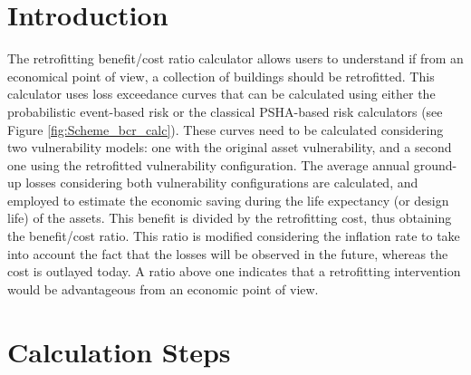 \section{Introduction}

The retrofitting benefit/cost ratio calculator allows users to understand if from an economical point of view, a collection of buildings should be retrofitted. This calculator uses loss exceedance curves that can be calculated using either the probabilistic event-based risk or the classical PSHA-based risk calculators (see Figure \ref{fig:Scheme_bcr_calc}). These curves need to be calculated considering two \glspl{vulnerability model}: one with the original asset vulnerability, and a second one using the retrofitted vulnerability configuration. The average annual ground-up losses considering both vulnerability configurations are calculated, and employed to estimate the economic saving during the life expectancy (or design life) of the \glspl{asset}. This benefit is divided by the retrofitting cost, thus obtaining the benefit/cost ratio. This ratio is modified considering the inflation rate to take into account the fact that the losses will be observed in the future, whereas the cost is outlayed today. A ratio above one indicates that a retrofitting intervention would be advantageous from an economic point of view.

\section{Calculation Steps}

